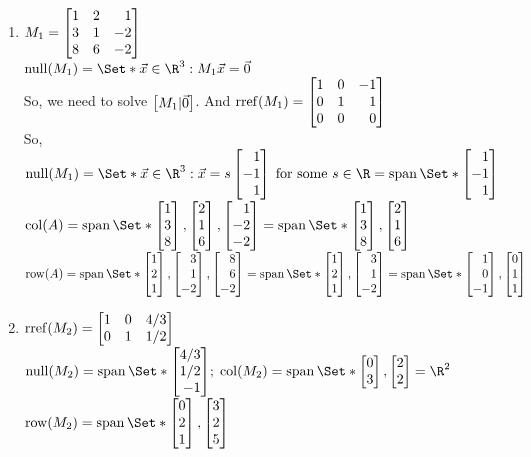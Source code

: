 \begin{exercises}
\begin{problist}
		\begin{solution}
		    \begin{enumerate}
    		    \item $M_1 = \mat{1&2&1\\3&1&-2\\8&6&-2}$\\
    		    $\Null(M_{1})=\Set*{\vec{x} \in \R^3: M_1 \vec{x}=\vec 0}$ \\
    		    So, we need to solve $\mat{M_1|\vec0}$. And $\rref(M_1)=\mat{1&0&-1\\0&1&1\\0&0&0}$\\
    		    So, $\Null(M_1)=\Set*{\vec x \in \R^3:\vec x = s\mat{1\\-1\\1} \; \text{for some } s\in\R}= \Span \Set*{\mat{1\\-1\\1}}$\\
    		    $\Col(A) = \Span\Set*{\mat{1\\3\\8},\mat{2\\1\\6},\mat{1\\-2\\-2}}= \Span\Set*{\mat{1\\3\\8},\mat{2\\1\\6}}$\\
    		    $\Row(A)=\Span\Set*{\mat{1\\2\\1},\mat{3\\1\\-2},\mat{8\\6\\-2}} =\Span\Set*{\mat{1\\2\\1},\mat{3\\1\\-2}}  =\Span\Set*{\mat{1\\0\\-1},\mat{0\\1\\1}}$
    		    
    		    \item $\rref(M_2)=\mat{1&0&4/3\\0&1&1/2}$\\
    		    $\Null(M_2)=\Span\Set*{\mat{4/3\\1/2\\-1}};\;\Col(M_2)=\Span\Set*{\mat{0\\3},\mat{2\\2}}=\R^2$\\
    		    $\Row(M_2)=\Span\Set*{\mat{0\\2\\1},\mat{3\\2\\5}}$
    		    

\end{enumerate}
\end{solution}
\end{problist}
\end{exercises}
